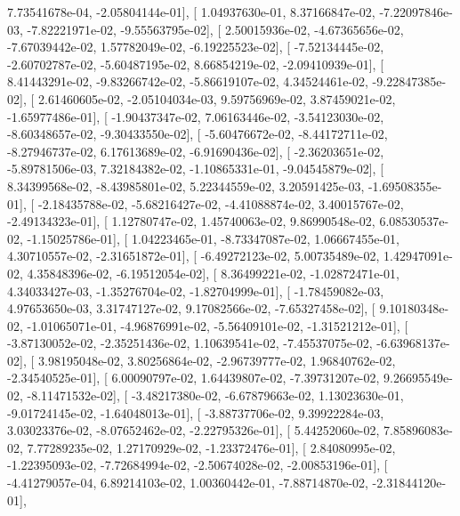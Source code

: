 \documentclass{article}
\begin{document}
          7.73541678e-04,  -2.05804144e-01],
       [  1.04937630e-01,   8.37166847e-02,  -7.22097846e-03,
         -7.82221971e-02,  -9.55563795e-02],
       [  2.50015936e-02,  -4.67365656e-02,  -7.67039442e-02,
          1.57782049e-02,  -6.19225523e-02],
       [ -7.52134445e-02,  -2.60702787e-02,  -5.60487195e-02,
          8.66854219e-02,  -2.09410939e-01],
       [  8.41443291e-02,  -9.83266742e-02,  -5.86619107e-02,
          4.34524461e-02,  -9.22847385e-02],
       [  2.61460605e-02,  -2.05104034e-03,   9.59756969e-02,
          3.87459021e-02,  -1.65977486e-01],
       [ -1.90437347e-02,   7.06163446e-02,  -3.54123030e-02,
         -8.60348657e-02,  -9.30433550e-02],
       [ -5.60476672e-02,  -8.44172711e-02,  -8.27946737e-02,
          6.17613689e-02,  -6.91690436e-02],
       [ -2.36203651e-02,  -5.89781506e-03,   7.32184382e-02,
         -1.10865331e-01,  -9.04545879e-02],
       [  8.34399568e-02,  -8.43985801e-02,   5.22344559e-02,
          3.20591425e-03,  -1.69508355e-01],
       [ -2.18435788e-02,  -5.68216427e-02,  -4.41088874e-02,
          3.40015767e-02,  -2.49134323e-01],
       [  1.12780747e-02,   1.45740063e-02,   9.86990548e-02,
          6.08530537e-02,  -1.15025786e-01],
       [  1.04223465e-01,  -8.73347087e-02,   1.06667455e-01,
          4.30710557e-02,  -2.31651872e-01],
       [ -6.49272123e-02,   5.00735489e-02,   1.42947091e-02,
          4.35848396e-02,  -6.19512054e-02],
       [  8.36499221e-02,  -1.02872471e-01,   4.34033427e-03,
         -1.35276704e-02,  -1.82704999e-01],
       [ -1.78459082e-03,   4.97653650e-03,   3.31747127e-02,
          9.17082566e-02,  -7.65327458e-02],
       [  9.10180348e-02,  -1.01065071e-01,  -4.96876991e-02,
         -5.56409101e-02,  -1.31521212e-01],
       [ -3.87130052e-02,  -2.35251436e-02,   1.10639541e-02,
         -7.45537075e-02,  -6.63968137e-02],
       [  3.98195048e-02,   3.80256864e-02,  -2.96739777e-02,
          1.96840762e-02,  -2.34540525e-01],
       [  6.00090797e-02,   1.64439807e-02,  -7.39731207e-02,
          9.26695549e-02,  -8.11471532e-02],
       [ -3.48217380e-02,  -6.67879663e-02,   1.13023630e-01,
         -9.01724145e-02,  -1.64048013e-01],
       [ -3.88737706e-02,   9.39922284e-03,   3.03023376e-02,
         -8.07652462e-02,  -2.22795326e-01],
       [  5.44252060e-02,   7.85896083e-02,   7.77289235e-02,
          1.27170929e-02,  -1.23372476e-01],
       [  2.84080995e-02,  -1.22395093e-02,  -7.72684994e-02,
         -2.50674028e-02,  -2.00853196e-01],
       [ -4.41279057e-04,   6.89214103e-02,   1.00360442e-01,
         -7.88714870e-02,  -2.31844120e-01],
\end{document}
